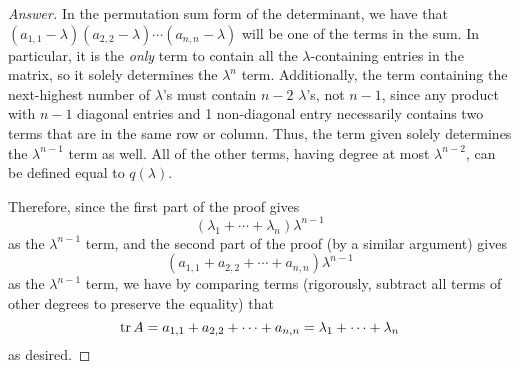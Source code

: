\documentclass[../psets.tex]{subfiles}
\begin{document}
\begin{enumerate}[label={\textbf{1.\arabic*.}}]
\begin{proof}[Answer]
        In the permutation sum form of the determinant, we have that $(a_{1,1}-\lambda)(a_{2,2}-\lambda)\cdots(a_{n,n}-\lambda)$ will be one of the terms in the sum. In particular, it is the \emph{only} term to contain all the $\lambda$-containing entries in the matrix, so it solely determines the $\lambda^n$ term. Additionally, the term containing the next-highest number of $\lambda$'s must contain $n-2$ $\lambda$'s, not $n-1$, since any product with $n-1$ diagonal entries and 1 non-diagonal entry necessarily contains two terms that are in the same row or column. Thus, the term given solely determines the $\lambda^{n-1}$ term as well. All of the other terms, having degree at most $\lambda^{n-2}$, can be defined equal to $q(\lambda)$.\par
        Therefore, since the first part of the proof gives
        \begin{equation*}
            (\lambda_1+\cdots+\lambda_n)\lambda^{n-1}
        \end{equation*}
        as the $\lambda^{n-1}$ term, and the second part of the proof (by a similar argument) gives
        \begin{equation*}
            (a_{1,1}+a_{2,2}+\cdots+a_{n,n})\lambda^{n-1}
        \end{equation*}
        as the $\lambda^{n-1}$ term, we have by comparing terms (rigorously, subtract all terms of other degrees to preserve the equality) that
        \begin{equation*}
            \trace A = a_{1,1}+a_{2,2}+\cdots+a_{n,n} = \lambda_1+\cdots+\lambda_n
        \end{equation*}
        as desired.
    \end{proof}
\end{enumerate}
\end{document}
